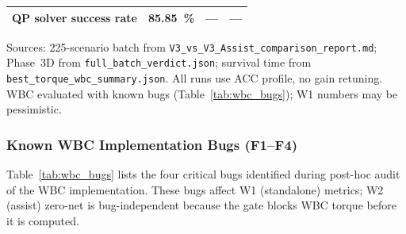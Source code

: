 \begin{table}[h]
\begin{tabular}{@{}lccc@{}}
QP solver success rate                                       & \SI{85.85}{\percent} & --- & --- \\
\bottomrule
\end{tabular}
\vspace{4pt}\par\noindent\footnotesize
Sources: 225-scenario batch from \texttt{V3\_vs\_V3\_Assist\_comparison\_report.md};
Phase~3D from \texttt{full\_batch\_verdict.json};
survival time from \texttt{best\_torque\_wbc\_summary.json}.
All runs use ACC profile, no gain retuning.
WBC evaluated with known bugs (Table~\ref{tab:wbc_bugs}); W1 numbers may be pessimistic.
\end{table}

\subsubsection{Known WBC Implementation Bugs (F1--F4)}

Table~\ref{tab:wbc_bugs} lists the four critical bugs identified during post-hoc audit of the WBC implementation.
These bugs affect W1 (standalone) metrics; W2 (assist) zero-net is bug-independent because the gate blocks WBC torque before it is computed.

